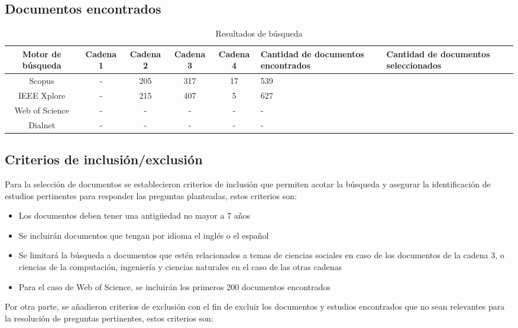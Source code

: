 \subsection{Documentos encontrados}

\begin{table}[H]
    \centering
    \begin{tabularx}{\textwidth}{|c|c|c|c|c|X|X|}
        \hline
        Motor de búsqueda  & Cadena 1 & Cadena 2 & Cadena 3 & Cadena 4 & Cantidad de documentos encontrados & Cantidad de documentos seleccionados \\ \hline
        Scopus & - &  205 & 317 & 17 & 539 & \\ \hline
        IEEE Xplore & - & 215 & 407 & 5 & 627 & \\ \hline
        Web of Science & - & - & - & - & - & \\ \hline
        Dialnet & - & - & - & - & - & \\ \hline
    \end{tabularx}
    \caption{Resultados de búsqueda}
    \label{tab:placeholder}
\end{table}

\subsection{Criterios de inclusión/exclusión}

Para la selección de documentos se establecieron criterios de inclusión que permiten acotar la búsqueda y asegurar la identificación de estudios pertinentes para responder las preguntas planteadas, estos criterios son:

\begin{itemize}
    \item Los documentos deben tener una antigüedad no mayor a 7 años
    \item Se incluirán documentos que tengan por idioma el inglés o el español
    \item Se limitará la búsqueda a documentos que estén relacionados a temas de ciencias sociales en caso de los documentos de la cadena 3, o ciencias de la computación, ingeniería y ciencias naturales en el caso de las otras cadenas
    \item Para el caso de Web of Science, se incluirán los primeros 200 documentos encontrados
\end{itemize}

Por otra parte, se añadieron criterios de exclusión con el fin de excluir los documentos y estudios encontrados que no sean relevantes para la resolución de preguntas pertinentes, estos criterios son:

